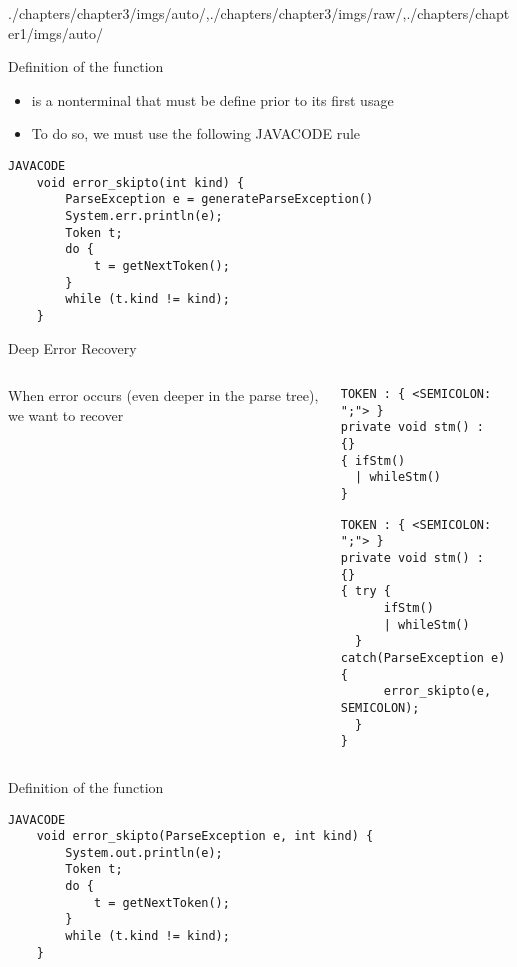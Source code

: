 \begin{graphicspathcontext}{{./chapters/chapter3/imgs/auto/},{./chapters/chapter3/imgs/raw/},{./chapters/chapter1/imgs/auto/}}
\begin{bibunit}[apalike]
\begin{frame}[fragile]{Definition of the function }
	\begin{itemize}
	\item {} is a nonterminal that must be define prior to its first usage
	\item To do so, we must use the following JAVACODE rule
	\end{itemize}
	\begin{lstlisting}[style=lststyle-java]
	JAVACODE
	void error_skipto(int kind) {
	    ParseException e = generateParseException()
	    System.err.println(e);
	    Token t;
	    do {
	        t = getNextToken();
	    }
	    while (t.kind != kind);
	}
	\end{lstlisting}
\end{frame}

\begin{frame}[t,fragile]{Deep Error Recovery}
	\begin{columns}
		\begin{column}{.3\linewidth}
			When error occurs (even deeper in the parse tree), we want to recover
		\end{column}
		\begin{column}{.7\linewidth}
			\vspace{-.5cm}
			\begin{lstlisting}[style=lststyle-java]
TOKEN : { <SEMICOLON: ";"> }
private void stm() :
{}
{ ifStm()
  | whileStm()
}
			\end{lstlisting}
			\mbox{}\hfill{}\hfill\mbox{}
			\begin{lstlisting}[style=lststyle-java]
TOKEN : { <SEMICOLON: ";"> }
private void stm() :
{}
{ try {
      ifStm()
      | whileStm()
  } catch(ParseException e) {
      error_skipto(e, SEMICOLON);
  }
}
			\end{lstlisting}
		\end{column}
	\end{columns}
\end{frame}

\begin{frame}[fragile]{Definition of the function }
	\begin{lstlisting}[style=lststyle-java]
	JAVACODE
	void error_skipto(ParseException e, int kind) {
	    System.out.println(e);
	    Token t;
	    do {
	        t = getNextToken();
	    }
	    while (t.kind != kind);
	}
	\end{lstlisting}
\end{frame}


\end{bibunit}
\end{graphicspathcontext}
